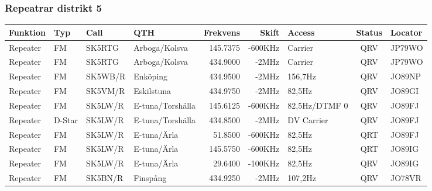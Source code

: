 \begin{landscape}
\subsubsection{Repeatrar distrikt 5}
\begin{longtable}{llllrrlcl}
	\textbf{Funktion}         & \textbf{Typ}  & \textbf{Call} & \textbf{QTH}        & \textbf{Frekvens} & \textbf{Skift} & \textbf{Access}  & \textbf{Status} & \textbf{Locator} \\ \hline
	\endhead
	Repeater                  & FM            & SK5RTG        & Arboga/Kolsva       & 145.7375          & -600KHz        & Carrier          & QRV             & JP79WO           \\
	Repeater                  & FM            & SK5RTG        & Arboga/Kolsva       & 434.9000          & -2MHz          & Carrier          & QRV             & JP79WO           \\
	Repeater                  & FM            & SK5WB/R       & Enköping            & 434.9500          & -2MHz          & 156,7Hz          & QRV             & JO89NP           \\
	Repeater                  & FM            & SK5VM/R       & Eskilstuna          & 434.9750          & -2MHz          & 82,5Hz           & QRV             & JO89GI           \\
	Repeater                  & FM            & SK5LW/R       & E-tuna/Torshälla    & 145.6125          & -600KHz        & 82,5Hz/DTMF 0    & QRV             & JO89FJ           \\
	Repeater                  & D-Star        & SK5LW/R       & E-tuna/Torshälla    & 434.8500          & -2MHz          & DV Carrier       & QRV             & JO89FJ           \\
	Repeater                  & FM            & SK5LW/R       & E-tuna/Ärla         & 51.8500           & -600KHz        & 82,5Hz           & QRT             & JO89FJ           \\
	Repeater                  & FM            & SK5LW/R       & E-tuna/Ärla         & 145.5750          & -600KHz        & 82,5Hz           & QRT             & JO89IG           \\
	Repeater                  & FM            & SK5LW/R       & E-tuna/Ärla         & 29.6400           & -100KHz        & 82,5Hz           & QRV             & JO89IG           \\
	Repeater                  & FM            & SK5BN/R       & Finspång            & 434.9250          & -2MHz          & 107,2Hz          & QRV             & JO78VR           \\

\end{longtable}
\end{landscape}
